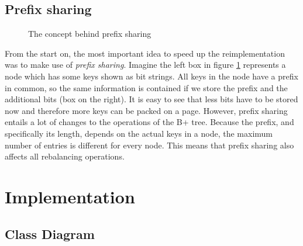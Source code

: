 \documentclass[11pt,a4paper,oneside]{article}
\begin{document}
\subsection{Prefix sharing}
\begin{figure}[ht]
\center
{}
\caption{The concept behind prefix sharing}
\label{fig:prefix-sharing}
\end{figure}

From the start on, the most important idea to speed up the reimplementation was to make use of \emph{prefix sharing}.
Imagine the left box in figure \ref{fig:prefix-sharing} represents a node which has some keys shown as bit strings.
All keys in the node have a prefix in common, so the same information is contained if we store the prefix and the additional bits (box on the right).
It is easy to see that less bits have to be stored now and therefore more keys can be packed on a page.
However, prefix sharing entails a lot of changes to the operations of the B+ tree. 
Because the prefix, and specifically its length, depends on the actual keys in a node, the maximum number of entries is different for every node.
This means that prefix sharing also affects all rebalancing operations.


\section{Implementation}
\subsection{Class Diagram} %
\label{sub:class_diagram}
\end{document}
